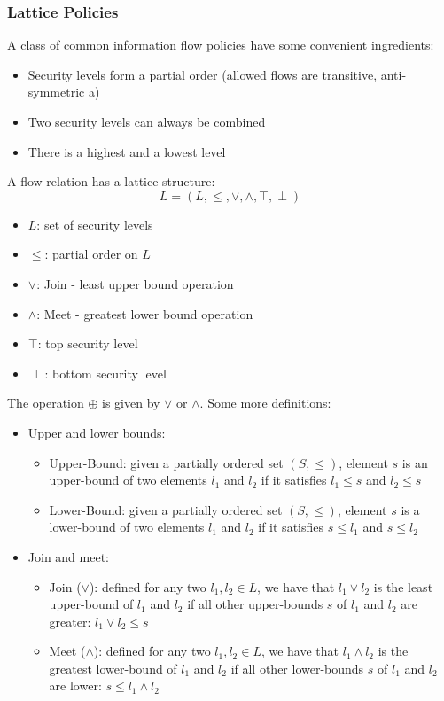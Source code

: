 \documentclass[10pt,a4paper]{report}
\begin{document}
\subsubsection{Lattice Policies}
A class of common information flow policies have some convenient ingredients:
\begin{itemize}
\item Security levels form a partial order (allowed flows are transitive, anti-symmetric a)
\item Two security levels can always be combined
\item There is a highest and a lowest level
\end{itemize}
A flow relation has a lattice structure:
$$
L = (L, \leq, \lor, \land, \top, \perp)
$$
\begin{itemize}
\item $L$: set of security levels
\item $\leq$: partial order on $L$
\item $\lor$: Join - least upper bound operation
\item $\land$: Meet - greatest lower bound operation
\item $\top$: top security level
\item $\perp$: bottom security level
\end{itemize}
The operation $\oplus$ is given by $\lor$ or $\land$. Some more definitions:
\begin{itemize}
\item Upper and lower bounds:
\begin{itemize}
\item Upper-Bound: given a partially ordered set $(S, \leq)$, element $s$ is an upper-bound of two elements $l_1$ and $l_2$ if it satisfies $l_1 \leq s$ and $l_2 \leq s$
\item Lower-Bound: given a partially ordered set $(S, \leq)$, element $s$ is a lower-bound of two elements $l_1$ and $l_2$ if it satisfies $s \leq l_1$ and $s \leq l_2$
\end{itemize}
\item Join and meet:
\begin{itemize}
\item Join ($\lor$): defined for any two $l_1, l_2 \in L$, we have that $l_1 \lor l_2$ is the least upper-bound of $l_1$ and $l_2$ if all other upper-bounds $s$ of $l_1$ and $l_2$ are greater: $l_1 \lor l_2 \leq s$
\item Meet ($\land$): defined for any two $l_1, l_2 \in L$, we have that $l_1 \land l_2$ is the greatest lower-bound of $l_1$ and $l_2$ if all other lower-bounds $s$ of $l_1$ and $l_2$ are lower: $s \leq l_1 \land l_2$
\end{itemize}
\end{itemize}
\end{document}
